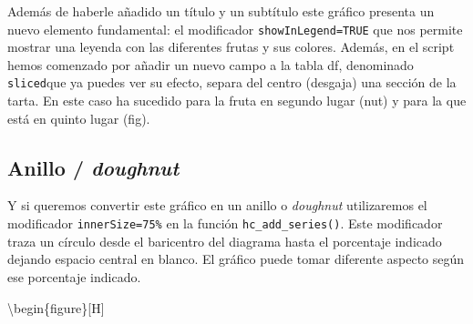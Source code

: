 \documentclass[
]{book}
\newenvironment{Shaded}{\begin{snugshade}}{\end{snugshade}}
\newcommand{\AttributeTok}[1]{\textcolor[rgb]{0.77,0.63,0.00}{#1}}
\newcommand{\ConstantTok}[1]{\textcolor[rgb]{0.00,0.00,0.00}{#1}}
\newcommand{\FunctionTok}[1]{\textcolor[rgb]{0.00,0.00,0.00}{#1}}
\newcommand{\NormalTok}[1]{#1}
\newcommand{\SpecialCharTok}[1]{\textcolor[rgb]{0.00,0.00,0.00}{#1}}
\newcommand{\StringTok}[1]{\textcolor[rgb]{0.31,0.60,0.02}{#1}}
\begin{document}
Además de haberle añadido un título y un subtítulo este gráfico presenta un nuevo elemento fundamental: el modificador \texttt{showInLegend=TRUE} que nos permite mostrar una leyenda con las diferentes frutas y sus colores. Además, en el script hemos comenzado por añadir un nuevo campo a la tabla df, denominado \texttt{sliced}que ya puedes ver su efecto, separa del centro (desgaja) una sección de la tarta. En este caso ha sucedido para la fruta en segundo lugar (nut) y para la que está en quinto lugar (fig).

\hypertarget{anillo-doughnut}{%
\subsection{\texorpdfstring{Anillo / \emph{doughnut}}{Anillo / doughnut}}\label{anillo-doughnut}}

Y si queremos convertir este gráfico en un anillo o \emph{doughnut} utilizaremos el modificador \texttt{innerSize=\textquotesingle{}75\%\textquotesingle{}} en la función \texttt{hc\_add\_series()}. Este modificador traza un círculo desde el baricentro del diagrama hasta el porcentaje indicado dejando espacio central en blanco. El gráfico puede tomar diferente aspecto según ese porcentaje indicado.

\begin{Shaded}
\end{Shaded}

\textbackslash begin\{figure\}{[}H{]}
\end{document}
